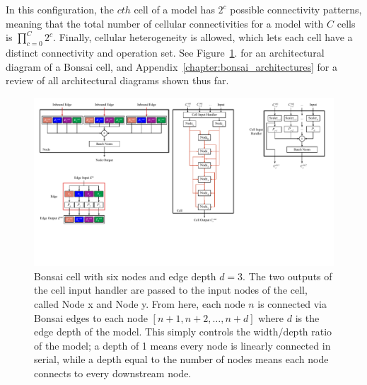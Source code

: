 In this configuration, the $cth$ cell of a model has
$2^c$ possible connectivity patterns, meaning that the total number of cellular connectivities for a model with $C$ cells
is $\prod_{c=0}^{C}{2^c}$. Finally, cellular heterogeneity is allowed, which lets each cell have a distinct
connectivity and operation set. See Figure~\ref{fig:bonsai_cell_mainbody}.
for an architectural diagram of a Bonsai cell, and Appendix~\ref{chapter:bonsai_architectures} for a review of all
architectural diagrams shown thus far.

\begin{figure}[t!]
	\centering
	\includegraphics[width=.68\textwidth]{cell}
	\caption[Bonsai cell with six nodes and edge depth $d=3$]{Bonsai cell with six nodes and edge depth $d=3$. The two outputs of the
	cell input handler are passed to the input nodes of the cell, called Node x and Node y. From here, each node $n$ is connected via Bonsai
edges to each node $[n+1, n+2, \dots, n+d]$ where $d$ is the edge depth of the model. This simply controls the width/depth
ratio of the model; a depth of 1 means every node is linearly connected in serial, while a depth equal to the number of
nodes means each node connects to every downstream node.}
	\label{fig:bonsai_cell_mainbody}
\end{figure}


